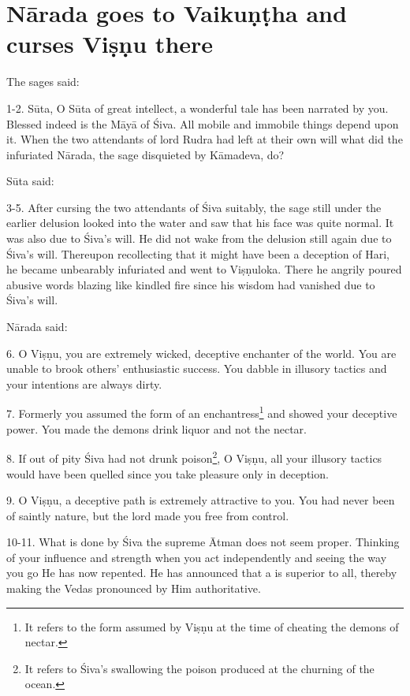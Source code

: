 \chapter{Nārada goes to Vaikuṇṭha and curses Viṣṇu there}

The sages said:

1-2. Sūta, O Sūta of great intellect, a wonderful tale has been narrated by you.
Blessed indeed is the Māyā of Śiva. All mobile and immobile things depend upon
it. When the two attendants of lord Rudra had left at their own will what did
the infuriated Nārada, the sage disquieted by Kāmadeva, do?

Sūta said:

3-5. After cursing the two attendants of Śiva suitably, the sage still under
the earlier delusion looked into the water and saw that his face was quite
normal. It was also due to Śiva’s will. He did not wake from the delusion still
again due to Śiva’s will. Thereupon recollecting that it might have been
a deception of Hari, he became unbearably infuriated and went to Viṣṇuloka.
There he angrily poured abusive words blazing like kindled fire since his wisdom
had vanished due to Śiva’s will.

Nārada said:

6. O Viṣṇu, you are extremely wicked, deceptive enchanter of the world. You are
unable to brook others’ enthusiastic success. You dabble in illusory tactics and
your intentions are always dirty.

7. Formerly you assumed the form of an enchantress\footnote{It refers to
the form assumed by Viṣṇu at the time of cheating the demons of nectar.} and
showed your deceptive power. You made the demons drink liquor and not
the nectar.

8. If out of pity Śiva had not drunk poison\footnote{It refers to Śiva’s
swallowing the poison produced at the churning of the ocean.}, O Viṣṇu, all your
illusory tactics would have been quelled since you take pleasure only in
deception.

9. O Viṣṇu, a deceptive path is extremely attractive to you. You had never been
of saintly nature, but the lord made you free from control.

10-11. What is done by Śiva the supreme Ātman does not seem proper. Thinking of
your influence and strength when you act independently and seeing the way you go
He has now repented. He has announced that a  is superior to all,
thereby making the Vedas pronounced by Him authoritative.

